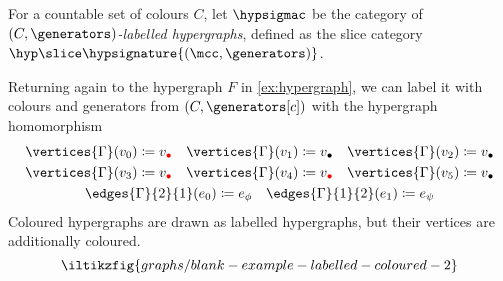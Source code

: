 \begin{definition}
    For a countable set of colours \(C\), let \(\hypsigmac\) be the category
    of \emph{\((C,\generators)\)-labelled hypergraphs}, defined as the slice
    category \(\hyp \slice \hypsignature{(\mcc,\generators)}\).
\end{definition}

\begin{example}\label{ex:coloured-hypergraph}
    Returning again to the hypergraph \(F\) in \cref{ex:hypergraph}, we can
    label it with colours and generators from \((C,\generators[c])\) with
    the hypergraph homomorphism
    \begin{gather*}
        \vertices{\Gamma}(v_0) \coloneqq v_{\redbullet}
        \quad
        \vertices{\Gamma}(v_1) \coloneqq v_{\bullet}
        \quad
        \vertices{\Gamma}(v_2) \coloneqq v_{\bullet}
        \\
        \vertices{\Gamma}(v_3) \coloneqq v_{\redbullet}
        \quad
        \vertices{\Gamma}(v_4) \coloneqq v_{\redbullet}
        \quad
        \vertices{\Gamma}(v_5) \coloneqq v_{\bullet}
        \\
        \edges{\Gamma}{2}{1}(e_0) \coloneqq e_{\phi}
        \quad
        \edges{\Gamma}{1}{2}(e_1) \coloneqq e_{\psi}
    \end{gather*}
    Coloured hypergraphs are drawn as labelled hypergraphs, but their vertices
    are additionally coloured.
    \[
        \iltikzfig{graphs/blank-example-labelled-coloured-2}
    \]
\end{example}